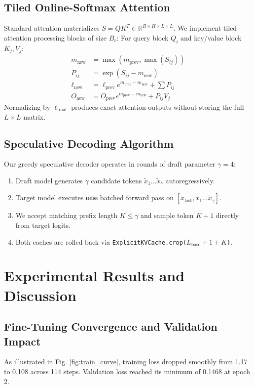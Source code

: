 \documentclass[conference]{IEEEtran}
\begin{document}
\subsection{Tiled Online-Softmax Attention}
Standard attention materializes $S = QK^T \in \mathbb{R}^{B \times H \times L \times L}$. We implement tiled attention processing blocks of size $B_r$:
For query block $Q_i$ and key/value block $K_j, V_j$:
\begin{align}
m_{\text{new}} &= \max(m_{\text{prev}}, \max(S_{ij})) \\
P_{ij} &= \exp(S_{ij} - m_{\text{new}}) \\
\ell_{\text{new}} &= \ell_{\text{prev}} e^{m_{\text{prev}} - m_{\text{new}}} + \sum P_{ij} \\
O_{\text{new}} &= O_{\text{prev}} e^{m_{\text{prev}} - m_{\text{new}}} + P_{ij}V_j
\end{align}
Normalizing by $\ell_{\text{final}}$ produces exact attention outputs without storing the full $L \times L$ matrix.

\subsection{Speculative Decoding Algorithm}
Our greedy speculative decoder operates in rounds of draft parameter $\gamma=4$:
\begin{enumerate}
    \item Draft model generates $\gamma$ candidate tokens $\tilde{x}_1 \dots \tilde{x}_\gamma$ autoregressively.
    \item Target model executes \textbf{one} batched forward pass on $[x_{\text{last}}, \tilde{x}_1 \dots \tilde{x}_\gamma]$.
    \item We accept matching prefix length $K \le \gamma$ and sample token $K+1$ directly from target logits.
    \item Both caches are rolled back via \texttt{ExplicitKVCache.crop($L_{\text{base}} + 1 + K$)}.
\end{enumerate}

\section{Experimental Results and Discussion}

\subsection{Fine-Tuning Convergence and Validation Impact}
As illustrated in Fig. \ref{fig:train_curve}, training loss dropped smoothly from 1.17 to 0.108 across 114 steps. Validation loss reached its minimum of 0.1468 at epoch 2. 
\end{document}
